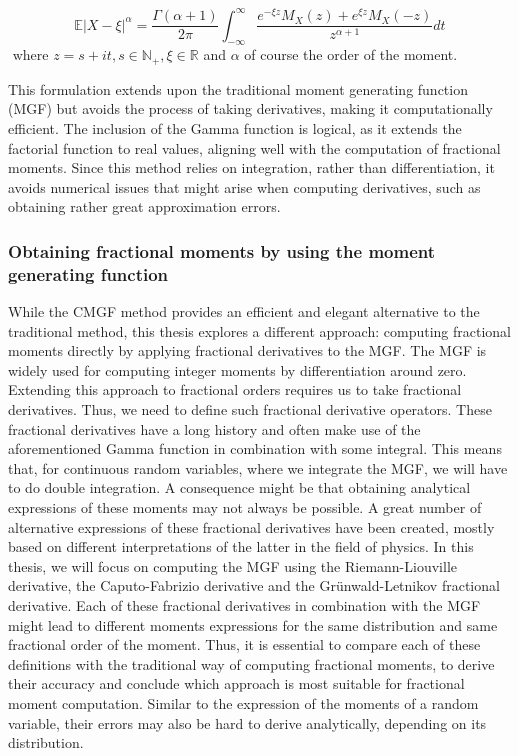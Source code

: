 \[\mathbb{E}\left| X - \xi \right|^\alpha = \frac{\Gamma(\alpha+1)}{2\pi} \int_{-\infty}^{\infty} \frac{e^{-\xi z} M_X(z) + e^{\xi z} M_X(-z)}{z^{\alpha+1}} dt\] \(\text{ where } z = s + it, s \in \mathbb{N_+}, \xi \in \mathbb{R} \) and \(\alpha\) of course the order of the moment.

This formulation extends upon the traditional moment generating function (MGF) but avoids the process of taking derivatives, making it computationally efficient. The inclusion of the Gamma function is logical, as it extends the factorial function to real values, aligning well with the computation of fractional moments. Since this method relies on integration, rather than differentiation, it avoids numerical issues that might arise when computing derivatives, such as obtaining rather great approximation errors.

\subsubsection{Obtaining fractional moments by using the moment generating function}
While the CMGF method provides an efficient  and elegant alternative to the traditional method, this thesis explores a different approach: computing fractional moments directly by applying fractional derivatives to the MGF. The MGF is widely used for computing integer moments by differentiation around zero. Extending this approach to fractional orders requires us to take fractional derivatives. Thus, we need to define such fractional derivative operators. These fractional derivatives have a long history and often make use of the aforementioned Gamma function in combination with some integral. This means that, for continuous random variables, where we integrate the MGF, we will have to do double integration. A consequence might be that obtaining analytical expressions of these moments may not always be possible. A great number of alternative expressions of these fractional derivatives have been created, mostly based on different interpretations of the latter in the field of physics. In this thesis, we will focus on computing the MGF using the Riemann-Liouville derivative, the Caputo-Fabrizio derivative and the Grünwald-Letnikov fractional derivative. Each of these fractional derivatives in combination with the MGF might lead to different moments expressions for the same distribution and same fractional order of the moment. Thus, it is essential to compare each of these definitions with the traditional way of computing fractional moments, to derive their accuracy and conclude which approach is most suitable for fractional moment computation. Similar to the expression of the moments of a random variable, their errors may also be hard to derive analytically, depending on its distribution.

